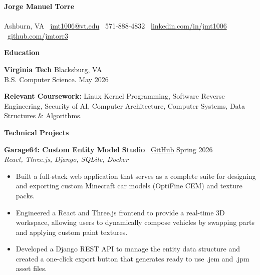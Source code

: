 \documentclass[10pt]{article}
\begin{document}
\begin{center}
    \textbf{\Large Jorge Manuel Torre} \\
    \vspace{2pt}
    \hrulefill \\
    \vspace{2pt}
    Ashburn, VA \textbullet \ \href{mailto:jmt1006@vt.edu}{jmt1006@vt.edu} \textbullet \ 571-888-4832 \textbullet \ \href{https://www.linkedin.com/in/jmt1006/}{linkedin.com/in/jmt1006} \textbullet \ \href{https://github.com/jmtorr3}{github.com/jmtorr3}
\end{center}

\vspace{-5pt}

\begin{center}
    \textbf{\large Education}
\end{center}
\vspace{-5pt}

\textbf{Virginia Tech} \hfill Blacksburg, VA \\
B.S. Computer Science. \hfill May 2026

\textbf{Relevant Coursework:} Linux Kernel Programming, Software Reverse Engineering, Security of AI, Computer Architecture, Computer Systems, Data Structures \& Algorithms.

\vspace{5pt}

\begin{center}
    \textbf{\large Technical Projects}
\end{center}
\vspace{-5pt}

\textbf{Garage64: Custom Entity Model Studio} \textbullet \ \href{https://github.com/jmtorr3/Garage64}{GitHub} \hfill Spring 2026 \\
\textit{React, Three.js, Django, SQLite, Docker}
\begin{itemize}[noitemsep, topsep=0pt, partopsep=0pt, parsep=0pt]
  \item Built a full-stack web application that serves as a complete suite for designing and exporting custom Minecraft car models (OptiFine CEM) and texture packs.
  \item Engineered a React and Three.js frontend to provide a real-time 3D workspace, allowing users to dynamically compose vehicles by swapping parts and applying custom paint textures.
  \item Developed a Django REST API to manage the entity data structure and created a one-click export button that generates ready to use .jem and .jpm asset files.
\end{itemize}
\end{document}
